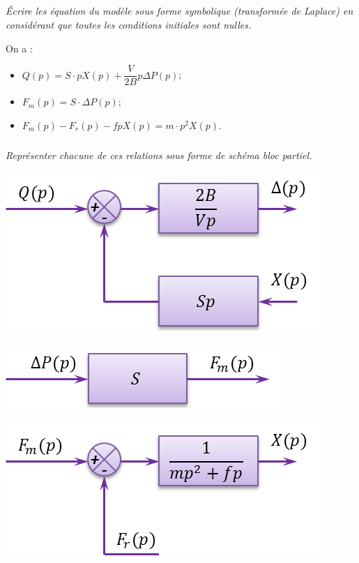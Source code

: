 \documentclass[10pt,fleqn]{article} %
\begin{document}
\begin{multicols}{2}
\subparagraph{}
\textit{Écrire les équation du modèle sous forme symbolique (transformée de Laplace) en considérant que toutes les conditions initiales sont nulles.}
\ifprof
\begin{corrige}
On a :
\begin{itemize}
\item $Q(p)=S\cdot pX(p)+\dfrac{V}{2B}p \Delta P(p)$;
\item $F_m(p)=S\cdot \Delta P(p)$;
\item $F_m(p)-F_r(p)-fpX(p)=m\cdot p^2 X(p)$.
\end{itemize}

\end{corrige}
\else \fi

\subparagraph{}
\textit{Représenter chacune de ces relations sous forme de schéma bloc partiel.}
\ifprof
\begin{corrige}
\begin{minipage}[c]{.3\linewidth}
\begin{center}
\includegraphics[width=.95\linewidth]{images/bloc5}
\end{center}
\end{minipage}\hfill
\begin{minipage}[c]{.3\linewidth}
\begin{center}
\includegraphics[width=.95\linewidth]{images/bloc6}
\end{center}
\end{minipage}\hfill
\begin{minipage}[c]{.3\linewidth}
\begin{center}
\includegraphics[width=.95\linewidth]{images/bloc7}
\end{center}
\end{minipage}


\end{corrige}
\end{multicols}
\end{document}
